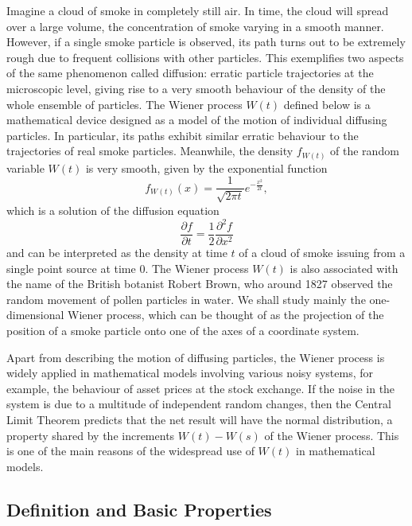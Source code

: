 Imagine a cloud of smoke in completely still air. In time, the cloud will spread over a large volume, the concentration of smoke varying in a smooth manner. However, if a single smoke particle is observed, its path turns out to be extremely rough due to frequent collisions with other particles. This exemplifies two aspects of the same phenomenon called diffusion: erratic particle trajectories at the microscopic level, giving rise to a very smooth behaviour of the density of the whole ensemble of particles. The Wiener process $W(t)$ defined below is a mathematical device designed as a model of the motion of individual diffusing particles. In particular, its paths exhibit similar erratic behaviour to the trajectories of real smoke particles. Meanwhile, the density $f_{W(t)}$ of the random variable $W(t)$ is very smooth, given by the exponential function
\begin{equation}
f_{W(t)}(x) = \frac{1}{\sqrt{2\pi t}} e^{-\frac{x^2}{2t}},
\label{eq:wiener-density}
\end{equation}
which is a solution of the diffusion equation
\begin{equation}
\frac{\partial f}{\partial t} = \frac{1}{2} \frac{\partial^2 f}{\partial x^2}
\label{eq:diffusion-equation}
\end{equation}
and can be interpreted as the density at time $t$ of a cloud of smoke issuing from a single point source at time 0. The Wiener process $W(t)$ is also associated with the name of the British botanist Robert Brown, who around 1827 observed the random movement of pollen particles in water. We shall study mainly the one-dimensional Wiener process, which can be thought of as the projection of the position of a smoke particle onto one of the axes of a coordinate system.

Apart from describing the motion of diffusing particles, the Wiener process is widely applied in mathematical models involving various noisy systems, for example, the behaviour of asset prices at the stock exchange. If the noise in the system is due to a multitude of independent random changes, then the Central Limit Theorem predicts that the net result will have the normal distribution, a property shared by the increments $W(t) - W(s)$ of the Wiener process. This is one of the main reasons of the widespread use of $W(t)$ in mathematical models.

\subsection{Definition and Basic Properties}
\label{sec:wiener-definition}

